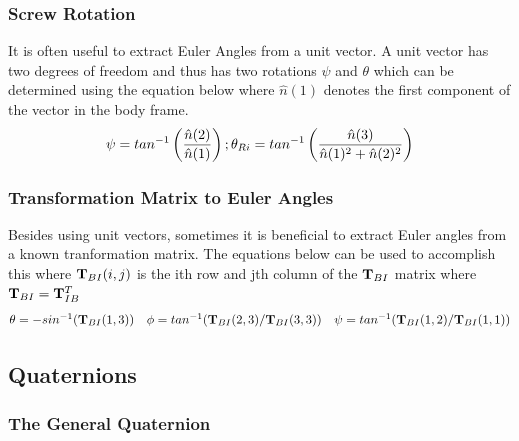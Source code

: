 \documentclass{article}
\begin{document}
\subsubsection{Screw Rotation}

It is often useful to extract Euler Angles from a unit vector. A unit
vector has two degrees of freedom and thus has two rotations
$\psi$ and $\theta$ which can be determined using the
equation below where $\hat{n}(1)$ denotes the first component of
the vector in the body frame. 
\begin{equation}
  \psi = tan^{-1}\left ( \frac{\hat{n}(2)}{\hat{n}(1)}
  \right) ; \\
  \theta_{Ri} = tan^{-1} \left ( \frac{\hat{n}(3)}{\hat{n}(1)^2 + \hat{n}(2)^2}
  \right)
\end{equation}

\subsubsection{Transformation Matrix to Euler Angles}

Besides using unit vectors, sometimes it is beneficial to extract
Euler angles from a known tranformation matrix. The equations below
can be used to accomplish this where ${\bf T}_{BI}(i,j)$ is the ith row and
jth column of the ${\bf T}_{BI}$ matrix where ${\bf T}_{BI} = {\bf T}_{IB}^T$
\begin{equation}
  \begin{matrix}
  \theta = -sin^{-1}({\bf T}_{BI}(1,3)) & \phi =
  tan^{-1}({\bf T}_{BI}(2,3)/{\bf T}_{BI}(3,3)) & \psi =
  tan^{-1}({\bf T}_{BI}(1,2)/{\bf T}_{BI}(1,1)) \end{matrix}
\end{equation}

\subsection{Quaternions}\label{s:quat}

\subsubsection{The General Quaternion}
\end{document}
